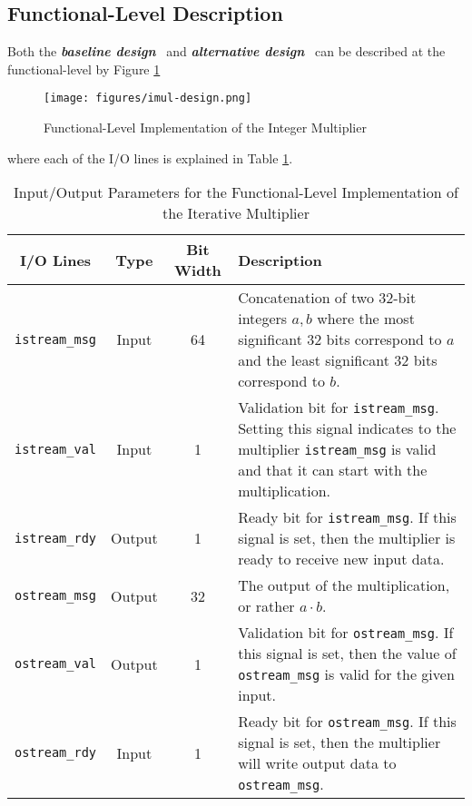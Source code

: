 \documentclass[10pt]{article}
\newcommand{\baseline}[0]{\textit{\textbf{baseline design}}}
\newcommand{\alternative}[0]{\textit{\textbf{alternative design}}}
\begin{document}
	\subsection{Functional-Level Description}
	\label{sec:alt_fld}

	Both the \baseline~ and \alternative~ can be described at the functional-level by Figure \ref{fig:imul_fl_design}

	\begin{figure}[!ht]
		\centering
		\texttt{[image: figures/imul-design.png]}
		\caption{Functional-Level Implementation of the Integer Multiplier}
		\label{fig:imul_fl_design}
		\citep*{lab_handout}
	\end{figure}

	where each of the I/O lines is explained in Table \ref{tab:imul_fl_params}.

	\begin{table}[!ht]
		\centering
		\begin{tabular}{|| c | c | c | p{80mm} ||} 
			\hline
			I/O Lines & Type & Bit Width & Description \\ [0.5ex] 
			\hline\hline
			\texttt{istream\_msg} & Input & 64 & Concatenation of two 32-bit integers $a,b$ where the most significant 32 bits correspond to $a$ and the least significant 32 bits correspond to $b$. \\
			\hline
			\texttt{istream\_val} & Input & 1 & Validation bit for \texttt{istream\_msg}. Setting this signal indicates to the multiplier \texttt{istream\_msg} is valid and that it can start with the multiplication. \\
			\hline
			\texttt{istream\_rdy} & Output & 1 & Ready bit for \texttt{istream\_msg}. If this signal is set, then the multiplier is ready to receive new input data. \\
			\hline
			\texttt{ostream\_msg} & Output & 32 & The output of the multiplication, or rather $a\cdot b$. \\
			\hline
			\texttt{ostream\_val} & Output & 1 & Validation bit for \texttt{ostream\_msg}. If this signal is set, then the value of \texttt{ostream\_msg} is valid for the given input. \\
			\hline
			\texttt{ostream\_rdy} & Input & 1 & Ready bit for \texttt{ostream\_msg}. If this signal is set, then the multiplier will write output data to \texttt{ostream\_msg}. \\ [1ex] 
			\hline
		\end{tabular}
		\caption{\label{tab:imul_fl_params}Input/Output Parameters for the Functional-Level Implementation of the Iterative Multiplier}
	\end{table}
\end{document}
